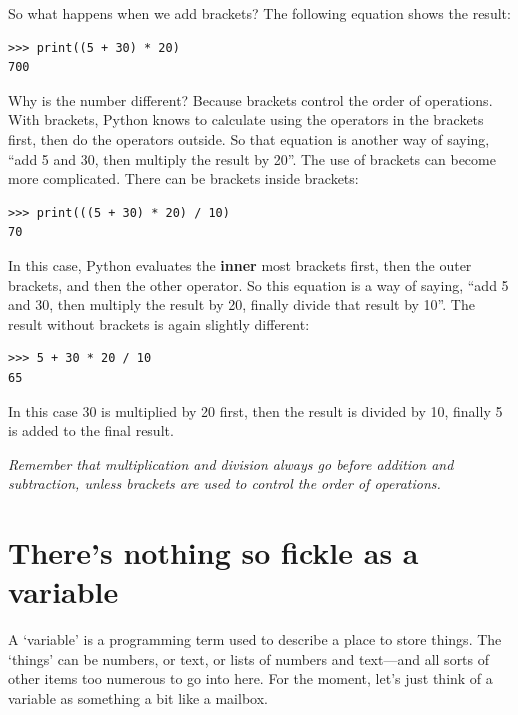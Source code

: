 \noindent
So what happens when we add brackets?  The following equation shows the result:

\begin{listing}
\begin{verbatim}
>>> print((5 + 30) * 20)
700
\end{verbatim}
\end{listing}

\noindent
Why is the number different?  Because brackets control the order of operations.  With brackets, Python knows to calculate using the operators in the brackets first, then do the operators outside.  So that equation is another way of saying, ``add 5 and 30, then multiply the result by 20''.
The use of brackets can become more complicated.  There can be brackets inside brackets:

\begin{listing}
\begin{verbatim}
>>> print(((5 + 30) * 20) / 10)
70
\end{verbatim}
\end{listing}

\noindent
In this case, Python evaluates the \textbf{inner} most brackets first, then the outer brackets, and then the other operator.  So this equation is a way of saying, ``add 5 and 30, then multiply the result by 20, finally divide that result by 10''.  The result without brackets is again slightly different:

\begin{listing}
\begin{verbatim}
>>> 5 + 30 * 20 / 10
65
\end{verbatim}
\end{listing}

In this case 30 is multiplied by 20 first, then the result is divided by 10, finally 5 is added to the final result.

\emph{Remember that multiplication and division always go before addition and subtraction, unless brackets are used to control the order of operations.}

\section{There's nothing so fickle as a variable}

A `variable' is a programming term used to describe a place to store things.  The `things' can be numbers, or text, or lists of numbers and text---and all sorts of other items too numerous to go into here.  For the moment, let's just think of a variable as something a bit like a mailbox.

